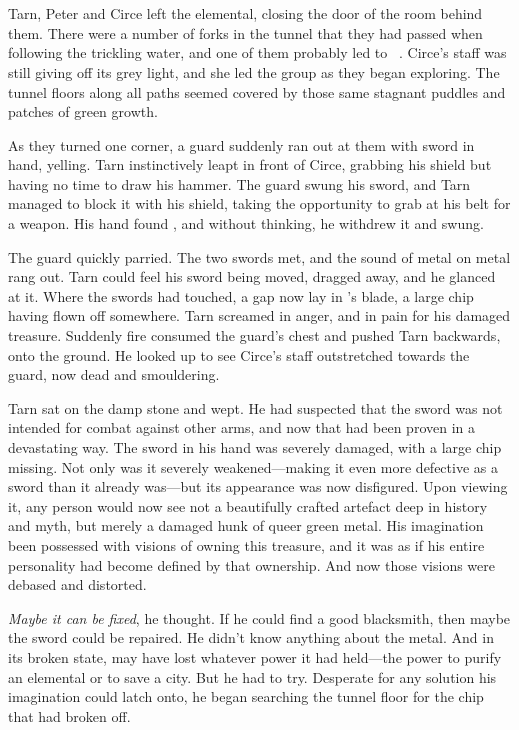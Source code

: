 \chapter{\mothzam\ \driktur}

Tarn, Peter and Circe left the elemental, closing the door of the room behind them.  There were a number of forks in the tunnel that they had passed when following the trickling water, and one of them probably led to \mothzam\ \driktur.  Circe's staff was still giving off its grey light, and she led the group as they began exploring.  The tunnel floors along all paths seemed covered by those same stagnant puddles and patches of green growth.

As they turned one corner, a guard suddenly ran out at them with sword in hand, yelling.  Tarn instinctively leapt in front of Circe, grabbing his shield but having no time to draw his hammer.    The guard swung his sword, and Tarn managed to block it with his shield, taking the opportunity to grab at his belt for a weapon.  His hand found \kildir, and without thinking, he withdrew it and swung.

The guard quickly parried.  The two swords met, and the sound of metal on metal rang out.  Tarn could feel his sword being moved, dragged away, and he glanced at it.  Where the swords had touched, a gap now lay in \kildir's blade, a large chip having flown off somewhere.  Tarn screamed in anger, and in pain for his damaged treasure.  Suddenly fire consumed the guard's chest and pushed Tarn backwards, onto the ground.  He looked up to see Circe's staff outstretched towards the guard, now dead and smouldering.

Tarn sat on the damp stone and wept.  He had suspected that the sword was not intended for combat against other arms, and now that had been proven in a devastating way.  The sword in his hand was severely damaged, with a large chip missing.  Not only was it severely weakened---making it even more defective as a sword than it already was---but its appearance was now disfigured.  Upon viewing it, any person would now see not a beautifully crafted artefact deep in history and myth, but merely a damaged hunk of queer green metal.  His imagination been possessed with visions of owning this treasure, and it was as if his entire personality had become defined by that ownership.  And now those visions were debased and distorted.

\emph{Maybe it can be fixed}, he thought.  If he could find a good blacksmith, then maybe the sword could be repaired.  He didn't know anything about the metal.  And in its broken state, \kildir may have lost whatever power it had held---the power to purify an elemental or to save a city.  But he had to try.  Desperate for any solution his imagination could latch onto, he began searching the tunnel floor for the chip that had broken off.

